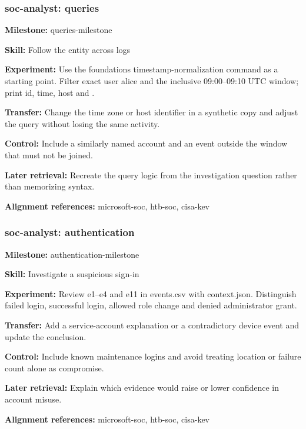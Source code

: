 \subsubsection{soc-analyst: queries}
\noindent\textbf{Milestone:} queries-milestone\par
\noindent\textbf{Skill:} Follow the entity across logs\par
\noindent\textbf{Experiment:} Use the foundations timestamp-normalization command as a starting point. Filter exact user alice and the inclusive 09:00–09:10 UTC window; print id, time, host and .\par
\noindent\textbf{Transfer:} Change the time zone or host identifier in a synthetic copy and adjust the query without losing the same activity.\par
\noindent\textbf{Control:} Include a similarly named account and an event outside the window that must not be joined.\par
\noindent\textbf{Later retrieval:} Recreate the query logic from the investigation question rather than memorizing syntax.\par
\noindent\textbf{Alignment references:} microsoft-soc, htb-soc, cisa-kev\par
\subsubsection{soc-analyst: authentication}
\noindent\textbf{Milestone:} authentication-milestone\par
\noindent\textbf{Skill:} Investigate a suspicious sign-in\par
\noindent\textbf{Experiment:} Review e1–e4 and e11 in events.csv with context.json. Distinguish failed login, successful login, allowed role change and denied administrator grant.\par
\noindent\textbf{Transfer:} Add a service-account explanation or a contradictory device event and update the conclusion.\par
\noindent\textbf{Control:} Include known maintenance logins and avoid treating location or failure count alone as compromise.\par
\noindent\textbf{Later retrieval:} Explain which evidence would raise or lower confidence in account misuse.\par
\noindent\textbf{Alignment references:} microsoft-soc, htb-soc, cisa-kev\par
